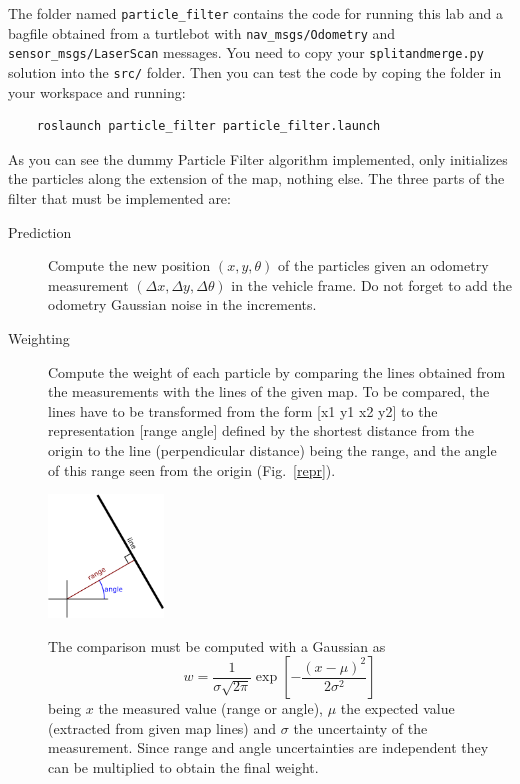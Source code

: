 \documentclass[a4paper,10pt]{article}
\begin{document}
The folder named \texttt{particle\_filter} contains the code for running this lab and a bagfile obtained from a turtlebot with \texttt{nav\_msgs/Odometry} and \texttt{sensor\_msgs/LaserScan} messages. You need to copy your \texttt{splitandmerge.py} solution into the \texttt{src/} folder. Then you can test the code by coping the folder in your workspace and running:

\begin{verbatim}
    roslaunch particle_filter particle_filter.launch
\end{verbatim}

As you can see the dummy Particle Filter algorithm implemented, only initializes the particles along the extension of the map, nothing else. The three parts of the filter that must be implemented are:

\begin{description}
    \item[Prediction] Compute the new position $(x, y, \theta)$ of the particles given an odometry measurement $(\Delta x, \Delta y, \Delta \theta )$ in the vehicle frame. Do not forget to add the odometry Gaussian noise in the increments.
    
    \item[Weighting] Compute the weight of each particle by comparing the lines obtained from the measurements with the lines of the given map. To be compared, the lines have to be transformed from the form [x1 y1 x2 y2] to the representation [range angle] defined by the shortest distance from the origin to the line (perpendicular distance) being the range, and the angle of this range seen from the origin (Fig.~\ref{repr}).
    
    \begin{center}
        \includegraphics[width=0.25\textwidth]{pict/lab3-repr}
        \label{repr}
    \end{center}
    
    The comparison must be computed with a Gaussian as
    \begin{equation}
        w = \frac{1}{\sigma \sqrt{2 \pi}} \exp \left[ - \frac{(x - \mu)^2}{2 \sigma^2} \right]
    \end{equation}
    being $x$ the measured value (range or angle), $\mu$ the expected value (extracted from given map lines) and $\sigma$ the uncertainty of the measurement. Since range and angle uncertainties are independent they can be multiplied to obtain the final weight.
    

\end{description}
\end{document}

